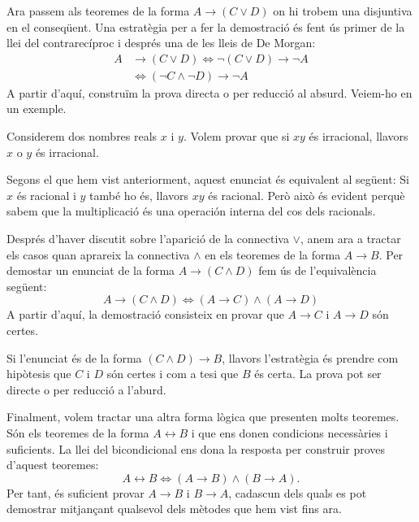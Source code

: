 \bigskip

Ara passem als teoremes de la forma $A\longrightarrow\left( C\vee D\right) $
on hi trobem una disjuntiva en el conseqüent. Una estratègia per a
fer la demostració és fent ús primer de la llei del contrarecíproc i després una de les lleis de De Morgan:
\begin{align*}
A & \longrightarrow\left( C\vee D\right) \Longleftrightarrow\lnot\left(
C\vee D\right) \longrightarrow\lnot A \\
& \Longleftrightarrow\left( \lnot C\wedge\lnot D\right) \longrightarrow
\lnot A
\end{align*}
A partir d'aquí, construïm la prova directa o per reducció al
absurd. Veiem-ho en un exemple.

\begin{exemple}
Considerem dos nombres reals $x$ i $y$. Volem provar que si $xy$ és
irracional, llavors $x$ o $y$ és irracional.
\end{exemple}

\begin{solucio}
Segons el que hem vist anteriorment, aquest enunciat és equivalent al següent: Si $x$ és racional i $y$ també ho és, llavors $xy$
és racional. Però això és evident perquè sabem que la
multiplicació és una operación interna del cos dels racionals.
\end{solucio}

\bigskip

Després d'haver discutit sobre l'aparició de la connectiva $\vee$,
anem ara a tractar els casos quan aprareix la connectiva $\wedge$ en els
teoremes de la forma $A\longrightarrow B$. Per demostar un enunciat de la
forma $A\longrightarrow\left( C\wedge D\right) $ fem ús de l'equivalència següent:\begin{equation*}
A\longrightarrow\left( C\wedge D\right) \Longleftrightarrow\left(
A\longrightarrow C\right) \wedge\left( A\longrightarrow D\right)
\end{equation*}
A partir d'aquí, la demostració consisteix en provar que $A\longrightarrow C$ i $A\longrightarrow D$ són certes.

Si l'enunciat és de la forma $\left( C\wedge D\right) \longrightarrow B$, llavors l'estratègia és prendre com hipòtesis que $C$ i $D$ són certes i com a tesi que $B$ és certa. La prova pot ser directe o
per reducció a l'aburd.

Finalment, volem tractar una altra forma lògica que presenten molts
teoremes. Són els teoremes de la forma $A\longleftrightarrow B$ i que
ens donen condicions necessàries i suficients. La llei del bicondicional
ens dona la resposta per construir proves d'aquest teoremes:\begin{equation*}
A\longleftrightarrow B\Longleftrightarrow\left( A\longrightarrow B\right)
\wedge\left( B\longrightarrow A\right) \text{.}
\end{equation*}
Per tant, és suficient provar $A\longrightarrow B$ i $B\longrightarrow A$, cadascun dels quals es pot demostrar mitjançant qualsevol dels mètodes que hem vist fins ara.

